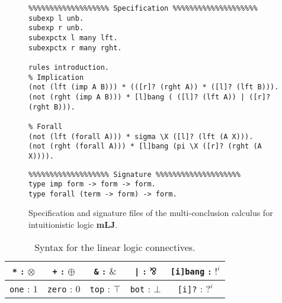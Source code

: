 \documentclass{llncs}
\begin{document}
\begin{figure}
\begin{verbatim}
%%%%%%%%%%%%%%%%%%% Specification %%%%%%%%%%%%%%%%%%%%
subexp l unb.
subexp r unb.
subexpctx l many lft.
subexpctx r many rght.

rules introduction.
% Implication
(not (lft (imp A B))) * (([r]? (rght A)) * ([l]? (lft B))).
(not (rght (imp A B))) * [l]bang ( ([l]? (lft A)) | ([r]? (rght B))).

% Forall
(not (lft (forall A))) * sigma \X ([l]? (lft (A X))).
(not (rght (forall A))) * [l]bang (pi \X ([r]? (rght (A X)))).
\end{verbatim}
\begin{verbatim}
%%%%%%%%%%%%%%%%%%% Signature %%%%%%%%%%%%%%%%%%%%
type imp form -> form -> form.
type forall (term -> form) -> form.
\end{verbatim}
\caption{Specification and signature files of the multi-conclusion
calculus for intuitionistic logic \textbf{mLJ}.}
\label{fig:input}
\end{figure}
%
\begin{table}
\centering
\begin{tabular}{|c|c|c|c|c|}
\hline
\texttt{*} : $\otimes$ & \texttt{+} : $\oplus$ & \texttt{\&} : $\&$ & \texttt{|} : $\bindnasrepma$ & \texttt{[i]bang} : $!^i$ \\
\hline
\texttt{one} : $1$ & \texttt{zero} : $0$ & \texttt{top} : $\top$ & \texttt{bot} : $\bot$ & \texttt{[i]?} : $?^i$ \\
\hline
\end{tabular}
\vspace{0.2cm}
\caption{Syntax for the linear logic connectives.}
\label{tbl:syntax_ll}
\end{table}
%
\end{document}
